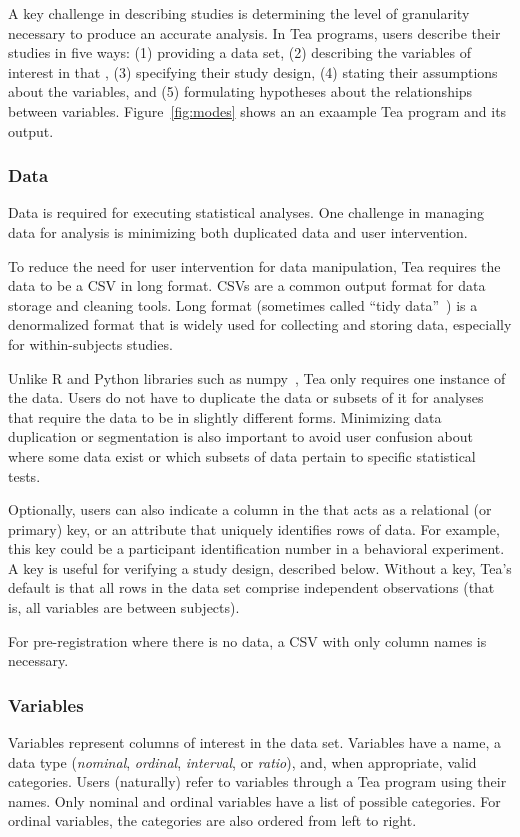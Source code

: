 A key challenge in describing studies is determining the level of granularity
necessary to produce an accurate analysis.  In Tea programs, users describe
their studies in five ways: (1) providing a data set, (2) describing the
variables of interest in that \dataSet, (3) specifying their study design, (4)
stating their assumptions about the variables, and (5) formulating hypotheses
about the relationships between variables. Figure~\ref{fig:modes} shows an
an exaample Tea program and its output. 


\subsubsection{Data}
Data is required for executing statistical analyses. One challenge in managing
data for analysis is minimizing both duplicated data and user intervention.

To reduce the need for user intervention for data manipulation, Tea
requires the data to be a CSV in long format. CSVs are a common output
format for data storage and cleaning tools. Long format (sometimes
called ``tidy data''~\cite{wickham2014tidy}) is a denormalized format
that is widely used for collecting and storing data, especially for
within-subjects studies.

Unlike R and Python libraries such as numpy~\cite{oliphant2006numpy}, Tea only
requires one instance of the data. Users do not have to duplicate the data or
subsets of it for analyses that require the data to be in slightly different
forms. Minimizing data duplication or segmentation is also important to avoid
user confusion about where some data exist or which subsets of data pertain to
specific statistical tests.

Optionally, users can also indicate a column in the \dataSet that acts
as a relational (or primary) key, or an attribute that uniquely
identifies rows of data. For example, this key could be a participant
identification number in a behavioral experiment. A key is useful for
verifying a study design, described below. Without a key, Tea's default
is that all rows in the data set comprise independent observations (that is, all
variables are between subjects).

For pre-registration where there is no data, a CSV with only column names is necessary.

\vspace{-7pt}
\subsubsection{Variables}
Variables represent columns of interest in the data set. Variables
have a name, a data type (\emph{nominal}, \emph{ordinal},
\emph{interval}, or \emph{ratio}), and, when appropriate, valid
categories.  Users (naturally) refer to variables through a Tea program using
their names. Only nominal and ordinal variables have a list of
possible categories. For ordinal variables, the categories are also
ordered from left to right.

